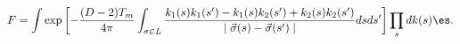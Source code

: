 \begin{equation}
F= \int \exp\left[ -\frac{(D-2) T_m}{4\pi} \int_{\sigma \in L} 
\frac{k_1 (s) k_1(s^\prime)-k_1 (s) k_2 (s^\prime) + k_2 (s) k_2 (s^\prime)}
{\mid \vec{\sigma}(s) - \vec{\sigma}(s^\prime) \mid} ds ds^\prime \right] 
\prod_s dk(s) \es.
\label{eq:arbgnsFlt}
\end{equation}

